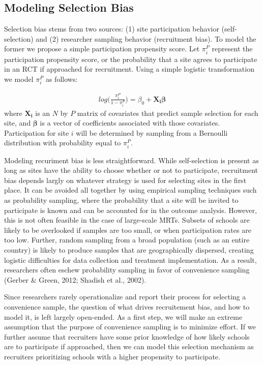 \documentclass[man,floatsintext]{apa6}
\begin{document}
\hypertarget{modeling-selection-bias}{%
\subsection{Modeling Selection Bias}\label{modeling-selection-bias}}

Selection bias stems from two sources: (1) site participation behavior (self-selection) and (2) researcher sampling behavior (recruitment bias). To model the former we propose a simple participation propensity score. Let \(\pi^P_i\) represent the participation propensity score, or the probability that a site agrees to participate in an RCT if approached for recruitment. Using a simple logistic transformation we model \(\pi^P_i\) as follows:

\begin{align} \label{eq:RGM}
  log\bigg(\frac{\pi^P_i}{1 - \pi^P_i}\bigg) = \beta_0 + \boldsymbol{X_i \beta}
\end{align}
where \(\boldsymbol{X_i}\) is an \(N\) by \(P\) matrix of covariates that predict sample selection for each site, and \(\boldsymbol{\beta}\) is a vector of coefficients associated with those covariates. Participation for site \(i\) will be determined by sampling from a Bernoulli distribution with probability equal to \(\pi^P_i\).

Modeling recuriment bias is less straightforward. While self-selection is present as long as sites have the ability to choose whether or not to participate, recruitment bias depends largly on whatever strategy is used for selecting sites in the first place. It can be avoided all together by using empirical sampling techniques such as probability sampling, where the probability that a site will be invited to participate is known and can be accounted for in the outcome analysis. However, this is not often feasible in the case of large-scale MRTs. Subsets of schools are likely to be overlooked if samples are too small, or when participation rates are too low. Further, random sampling from a broad population (such as an entire country) is likely to produce samples that are geographically dispersed, creating logistic difficulties for data collection and treatment implementation. As a result, researchers often eschew probability sampling in favor of convenience sampling (Gerber \& Green, 2012; Shadish et al., 2002).

Since researchers rarely operationalize and report their process for selecting a convenience sample, the question of what drives recruitement bias, and how to model it, is left largely open-ended. As a first step, we will make an extreme assumption that the purpose of convenience sampling is to minimize effort. If we further assume that recruiters have some prior knowledge of how likely schools are to participate if approached, then we can model this selection mechanism as recruiters prioritizing schools with a higher propensity to participate.
\end{document}
